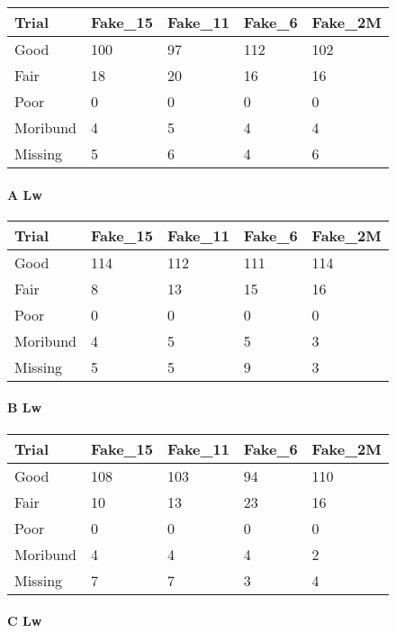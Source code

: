 \documentclass[
]{article}
\begin{document}
\begin{tabular}{l|l|l|l|l}
\hline
Trial & Fake\_15 & Fake\_11 & Fake\_6 & Fake\_2M\\
\hline
Good & 100 & 97 & 112 & 102\\
\hline
Fair & 18 & 20 & 16 & 16\\
\hline
Poor & 0 & 0 & 0 & 0\\
\hline
Moribund & 4 & 5 & 4 & 4\\
\hline
Missing & 5 & 6 & 4 & 6\\
\hline
\end{tabular}

\hypertarget{a-lw}{%
\paragraph{A Lw}\label{a-lw}}

\begin{tabular}{l|l|l|l|l}
\hline
Trial & Fake\_15 & Fake\_11 & Fake\_6 & Fake\_2M\\
\hline
Good & 114 & 112 & 111 & 114\\
\hline
Fair & 8 & 13 & 15 & 16\\
\hline
Poor & 0 & 0 & 0 & 0\\
\hline
Moribund & 4 & 5 & 5 & 3\\
\hline
Missing & 5 & 5 & 9 & 3\\
\hline
\end{tabular}

\hypertarget{b-lw}{%
\paragraph{B Lw}\label{b-lw}}

\begin{tabular}{l|l|l|l|l}
\hline
Trial & Fake\_15 & Fake\_11 & Fake\_6 & Fake\_2M\\
\hline
Good & 108 & 103 & 94 & 110\\
\hline
Fair & 10 & 13 & 23 & 16\\
\hline
Poor & 0 & 0 & 0 & 0\\
\hline
Moribund & 4 & 4 & 4 & 2\\
\hline
Missing & 7 & 7 & 3 & 4\\
\hline
\end{tabular}

\hypertarget{c-lw}{%
\paragraph{C Lw}\label{c-lw}}
\end{document}
